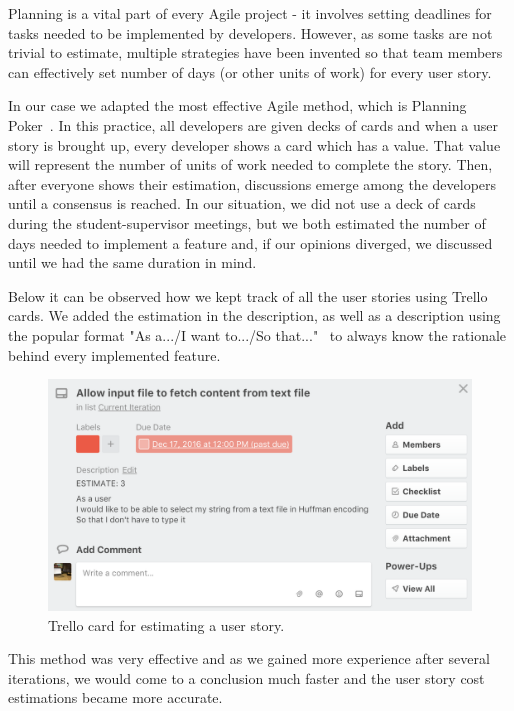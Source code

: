 \documentclass{l4proj}
\begin{document}
Planning is a vital part of every Agile project - it involves setting deadlines for tasks needed to be implemented by
developers. However, as some tasks are not trivial to estimate, multiple strategies have been invented so that team
members can effectively set number of days (or other units of work) for every user story.

In our case we adapted the most effective Agile method, which is
Planning Poker~\cite{planning-poker}. In this practice, all developers are given decks of cards and when a user story is brought up, every developer shows a card which has a value. That value will represent the number of units of work
needed to complete the story. Then, after everyone shows their estimation, discussions emerge among the developers until a consensus is reached. In our situation, we did not use a deck of cards during the student-supervisor meetings, but we both estimated the number of days needed to implement a feature and, if our opinions diverged, we discussed until we had the same duration in mind.

Below it can be observed how we kept track of all the user stories using Trello cards. We added the estimation in the description, as well as a description using the popular format "As a.../I want to.../So that..."~\cite{user-story-format} to always know the
rationale behind every implemented feature.

\pagebreak

\begin{figure}[!ht]
\centering
\includegraphics[scale=0.5]{estimation}
\caption{Trello card for estimating a user story.}
\label{fig:estimation}
\end{figure}

This method was very effective and as we gained more experience after several iterations, we would come to a conclusion
much faster and the user story cost estimations became more accurate.
\end{document}
